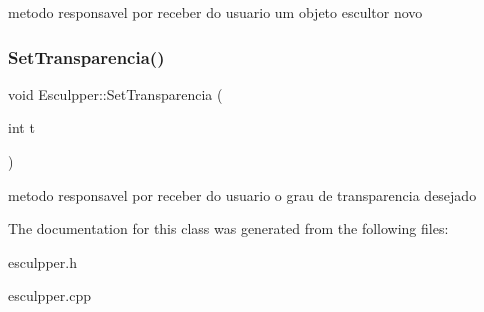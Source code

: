 metodo responsavel por receber do usuario um objeto escultor novo \mbox{\label{class_esculpper_a61f1f97e68ffae1aa19b61c18231dce4}} 
\subsubsection{\texorpdfstring{SetTransparencia()}{SetTransparencia()}}
{\footnotesize\ttfamily void Esculpper\+::\+Set\+Transparencia (\begin{DoxyParamCaption}\item[{int}]{t }\end{DoxyParamCaption})}

metodo responsavel por receber do usuario o grau de transparencia desejado 

The documentation for this class was generated from the following files\+:\begin{DoxyCompactItemize}
\item 
esculpper.\+h\item 
esculpper.\+cpp\end{DoxyCompactItemize}
